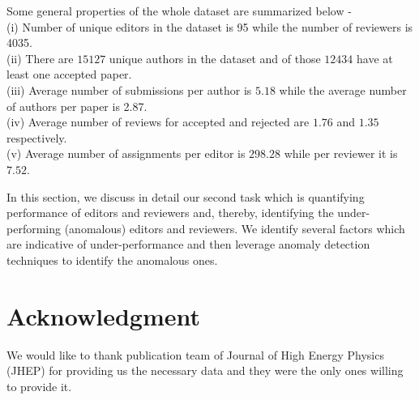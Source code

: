 Some general properties of the whole dataset are summarized below - \\
(i) Number of unique editors in the dataset is 95 while the number of reviewers is 4035.\\ 
(ii) There are $15127$ unique authors in the dataset and of those $12434$ have at least one accepted paper.\\
(iii) Average number of submissions per author is $5.18$ while the average number of authors per paper is 2.87.\\
(iv) Average number of reviews for accepted and rejected are $1.76$ and $1.35$ respectively.\\
(v) Average number of assignments per editor is $298.28$ while per reviewer it is $7.52$.\\

%
\fi

In this section, we discuss in detail our second task which is quantifying performance of editors and reviewers and, thereby, identifying the 
under-performing (anomalous) editors and reviewers. We identify several factors which are indicative of under-performance and then 
leverage anomaly detection techniques to identify the anomalous ones.











%


%

%
\section*{Acknowledgment}
We would like to thank publication team of Journal of High Energy Physics (JHEP) for providing us the necessary data and they were the only ones willing to provide it.

